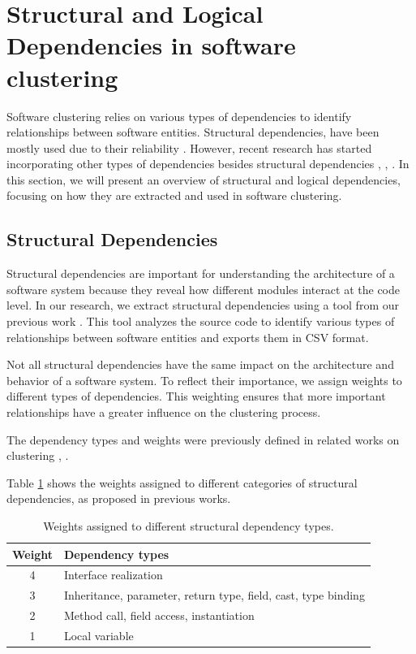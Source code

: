 \documentclass{ieeeaccess}
\begin{document}

\section{Structural and Logical Dependencies in software clustering}
\label{sec:dependencies}

Software clustering relies on various types of dependencies to identify relationships between software entities. Structural dependencies, have been mostly used due to their reliability \cite{b12}. However, recent research has started incorporating other types of dependencies besides structural dependencies \cite{b13}, \cite{b14}, \cite{b18}.  In this section, we will present an overview of structural and logical dependencies, focusing on how they are extracted and used in software clustering.

\subsection{Structural Dependencies}

Structural dependencies are important for understanding the architecture of a software system because they reveal how different modules interact at the code level. In our research, we extract structural dependencies using a tool from our previous work \cite{b4}. This tool analyzes the source code to identify various types of relationships between software entities and exports them in CSV format.

Not all structural dependencies have the same impact on the architecture and behavior of a software system. To reflect their importance, we assign weights to different types of dependencies. This weighting ensures that more important relationships have a greater influence on the clustering process.

The dependency types and weights were previously defined in related works on clustering \cite{b19}, \cite{b20}.

Table \ref{tab:structural_weights} shows the weights assigned to different categories of structural dependencies, as proposed in previous works.

\begin{table}[htbp]
\centering
\begin{tabular}{|c|l|}
\hline
\textbf{Weight} & \textbf{Dependency types} \\ 
\hline
4 & Interface realization \\
3 & Inheritance, parameter, return type, field, cast, type binding \\ 
2 & Method call, field access, instantiation \\ 
1 & Local variable \\ 
 \hline
\end{tabular}
\caption{Weights assigned to different structural dependency types. \cite{b20}}
\label{tab:structural_weights}
\end{table}
\end{document}
